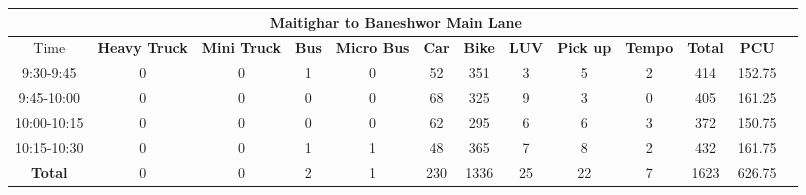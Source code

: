 \begin{landscape}
\begin{table}[h!]
\vspace{0.5cm}
\begin{tabular}{|c|c|c|c|c|c|c|c|c|c|c|c|c|}
    \hline
    \multicolumn{12}{|c|}{\textbf{Maitighar to Baneshwor Main Lane}} \\
    \hline
        Time & \textbf{Heavy Truck} & \textbf{Mini Truck} & \textbf{Bus} & \textbf{Micro Bus} & \textbf{Car} & \textbf{Bike} & \textbf{LUV} & \textbf{Pick up} & \textbf{Tempo} & \textbf{\textbf{Total}} & \textbf{PCU} \\
    \hline
9:30-9:45	&0	&0	&1	&0	&52	&351	&3	&5	&2	&414	&152.75 \\ \hline
9:45-10:00	&0	&0	&0	&0	&68	&325	&9	&3	&0	&405	&161.25 \\ \hline
10:00-10:15	&0	&0	&0	&0	&62	&295	&6	&6	&3	&372	&150.75 \\ \hline
10:15-10:30	&0	&0	&1	&1	&48	&365	&7	&8	&2	&432	&161.75 \\ \hline
\textbf{Total}	&0	&0	&2	&1	&230	&1336	&25	&22	&7	&1623	&626.75 \\ \hline

\end{tabular}

\end{table}
\end{landscape}


